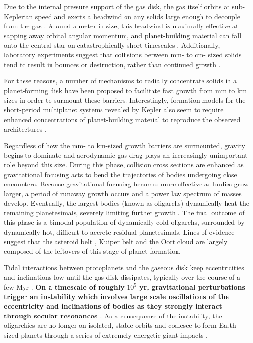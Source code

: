 \documentclass[twocolumn,linenumbers]{aastex63}
\begin{document}
Due to the internal pressure support
of the gas disk, the gas itself orbits at sub-Keplerian speed and
exerts a headwind on any solids large enough to decouple from the gas
\citep{weidenschilling77}. Around a meter in size, this headwind
is maximally effective at sapping away orbital angular momentum, and planet-building material can fall onto the central star on 
catastrophically short timescales \citep{weidenschilling77, nakagawa86}. Additionally, laboratory experiments suggest that 
collisions between mm- to cm- sized solids tend to result in bounces or destruction, rather than continued growth
\citep{blum93, colwell03, beitz11}.

For these reasons, a number of mechanisms to radially concentrate solids in a planet-forming disk have been proposed to 
facilitate fast growth from mm to km sizes \citep{johansen07, lyra08, bai10} in order to surmount these barriers. Interestingly, 
formation models for the short-period multiplanet systems revealed by Kepler \citep{fabrycky14} also seem to require enhanced 
concentrations of planet-building material to reproduce the observed architectures \citep{raymond07, hansen12}.

Regardless of how the mm- to km-sized growth barriers are surmounted, gravity begins to dominate and aerodynamic gas drag 
plays an increasingly unimportant role beyond this size. During this phase, collision cross sections are enhanced as gravitational 
focusing \citep{safronov69} acts to bend the trajectories of bodies undergoing close encounters. Because gravitational focusing 
becomes more effective as bodies grow larger, a period of runaway growth occurs \citep{wetherill89, kokubo96, barnes09} and a 
power law spectrum of masses develop. Eventually, the largest bodies (known as oligarchs) dynamically heat the remaining 
planetesimals, severely limiting further growth \citep{kokubo98}. The final outcome of this phase is a bimodal population of 
dynamically cold oligarchs, surrounded by dynamically hot, difficult to accrete residual planetesimals. Lines of evidence suggest 
that the asteroid belt \citep{bottke05, morbidelli09}, Kuiper belt \citep{duncan89, levison08, sheppard10} and the Oort cloud  \citep{levison11} are largely composed of the leftovers of this stage of planet formation.

Tidal interactions between protoplanets and the gaseous disk keep eccentricities and inclinations low until the gas disk dissipates, typically over the course of a few Myr \citep{mamajek09}. \textbf{On a timescale of roughly $10^{5}$ yr, gravitational perturbations trigger an instability which involves large scale oscillations of the eccentricity and inclinations of bodies as they strongly interact through secular resonances \citep{chambers98}.}
As a consequence of the instability, the oligarchics are no longer
on isolated, stable orbits and coalesce to form Earth-sized planets
through a series of extremely energetic giant 
impacts \citep{kokubo02, raymond05, raymond06}. 
\end{document}
